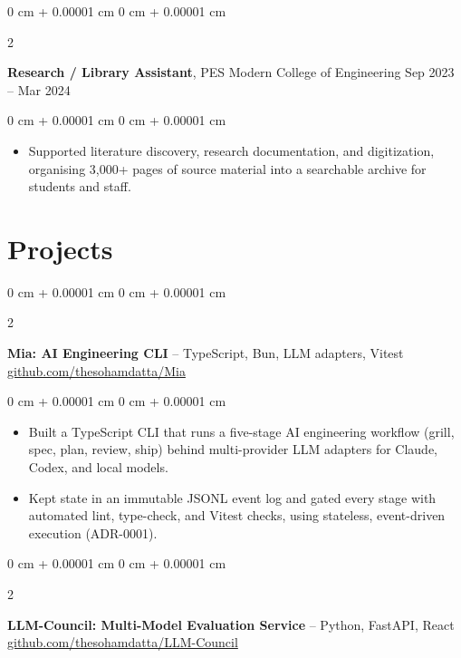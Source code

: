 \documentclass[10pt, letterpaper]{article}
\newenvironment{highlights}{
    \begin{itemize}[
        topsep=0.10 cm,
        parsep=0.10 cm,
        partopsep=0pt,
        itemsep=0pt,
        leftmargin=0 cm + 10pt
    ]
}{
    \end{itemize}
} %
\newenvironment{onecolentry}{
    \begin{adjustwidth}{
        0 cm + 0.00001 cm
    }{
        0 cm + 0.00001 cm
    }
}{
    \end{adjustwidth}
} %
\newenvironment{twocolentry}[2][]{
    \onecolentry
    \def\secondColumn{#2}
    \setcolumnwidth{\fill, 4.5 cm}
    \begin{paracol}{2}
}{
    \switchcolumn \raggedleft \secondColumn
    \end{paracol}
    \endonecolentry
} %
\begin{document}
        \vspace{0.12 cm}

        \begin{twocolentry}{
            Sep 2023 -- Mar 2024
        }
            \textbf{Research / Library Assistant}, PES Modern College of Engineering\end{twocolentry}

        \vspace{0.06 cm}
        \begin{onecolentry}
            \begin{highlights}
                \item Supported literature discovery, research documentation, and digitization, organising 3,000+ pages of source material into a searchable archive for students and staff.
            \end{highlights}
        \end{onecolentry}

    \section{Projects}

        \begin{twocolentry}{
            {\footnotesize\href{https://github.com/thesohamdatta/Mia}{github.com/thesohamdatta/Mia}}
        }
            \textbf{Mia: AI Engineering CLI} -- TypeScript, Bun, LLM adapters, Vitest\end{twocolentry}

        \vspace{0.06 cm}
        \begin{onecolentry}
            \begin{highlights}
                \item Built a TypeScript CLI that runs a five-stage AI engineering workflow (grill, spec, plan, review, ship) behind multi-provider LLM adapters for Claude, Codex, and local models.
                \item Kept state in an immutable JSONL event log and gated every stage with automated lint, type-check, and Vitest checks, using stateless, event-driven execution (ADR-0001).
            \end{highlights}
        \end{onecolentry}

        \vspace{0.12 cm}

        \begin{twocolentry}{
            {\footnotesize\href{https://github.com/thesohamdatta/LLM-Council}{github.com/thesohamdatta/LLM-Council}}
        }
            \textbf{LLM-Council: Multi-Model Evaluation Service} -- Python, FastAPI, React\end{twocolentry}
\end{document}
